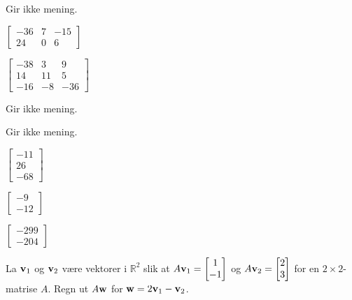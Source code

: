 \begin{losning}

\begin{punkt}
Gir ikke mening.
\end{punkt}

\begin{punkt}
$\begin{bmatrix}
-36 & 7 & -15\\
24 & 0 & 6
\end{bmatrix}$
\end{punkt}

\begin{punkt}
$\begin{bmatrix}
-38 & 3 & 9\\
14 & 11 & 5\\
-16 & -8 & -36
\end{bmatrix}$
\end{punkt}

\begin{punkt}
Gir ikke mening.
\end{punkt}

\begin{punkt}
Gir ikke mening.
\end{punkt}

\begin{punkt}
$\begin{bmatrix}
-11\\
26\\
-68
\end{bmatrix}$
\end{punkt}


\begin{punkt}
$\begin{bmatrix}
-9\\
-12
\end{bmatrix}$
\end{punkt}


\begin{punkt}
$\begin{bmatrix}
-299\\
-204
\end{bmatrix}$
\end{punkt}

\end{losning}

\begin{oppgave}
La $\mathbf{v}_1$ og $\mathbf{v}_2$ være vektorer i $\mathbb{R}^2$ slik at $A\mathbf{v}_1=\begin{bmatrix} 1 \\ -1 \end{bmatrix}$ og $A\mathbf{v}_2=\begin{bmatrix} 2 \\ 3 \end{bmatrix}$ for en $2\times 2$-matrise $A$. Regn ut $A\mathbf{w}$ for $\mathbf{w}=2\mathbf{v}_1-\mathbf{v}_2$.
\end{oppgave}

